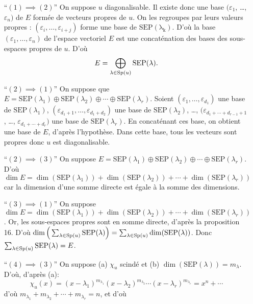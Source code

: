 \begin{prv}
	\begin{itemize}
		\item[``$(1)\implies(2)$''] On suppose $u$\/ diagonalisable. Il existe donc une base $(\varepsilon_1$, \ldots, $\varepsilon_n)$\/ de $E$\/ formée de vecteurs propres de $u$. On les regroupes par leurs valeurs propres : $(\varepsilon_i, \ldots, \varepsilon_{i+j})$\/ forme une base de $\mathrm{SEP(\lambda_k)}$. D'où la base $(\varepsilon_1, \ldots, \varepsilon_n)$\/ de l'espace vectoriel $E$\/ est une concaténation des bases des sous-espaces propres de $u$. D'où \[
				E = \bigoplus_{\lambda \in \operatorname{Sp}(u)} \mathrm{SEP}(\lambda)
			.\]
		\item[``$(2)\implies(1)$''] On suppose que $E = \mathrm{SEP}(\lambda_1) \oplus \mathrm{SEP}(\lambda_2) \oplus \cdots \oplus \mathrm{SEP}(\lambda_r)$.
			Soient $(\varepsilon_1, \ldots, \varepsilon_{d_1})$\/ une base de $\mathrm{SEP}(\lambda_1)$, $(\varepsilon_{d_1 + 1}, \ldots, \varepsilon_{d_1 + d_2})$\/ une base de $\mathrm{SEP}(\lambda_2)$, \ldots, $(\varepsilon_{d_1+\cdots + d_{r-1}+1}$, \ldots, $\varepsilon_{d_1+ \cdots + d_r})$\/ une base de $\mathrm{SEP}(\lambda_r)$.
			En concaténant ces base, on obtient une base de $E$, d'après l'hypothèse. Dans cette base, tous les vecteurs sont propres donc $u$\/ est diagonalisable.
		\item[``$(2)\implies(3)$''] On suppose $E = \mathrm{SEP}(\lambda_1) \oplus \mathrm{SEP}(\lambda_2) \oplus \cdots \oplus \mathrm{SEP}(\lambda_r)$. D'où  \[
					\dim E = \dim(\mathrm{SEP}(\lambda_1)) + \dim(\mathrm{SEP}(\lambda_2)) + \cdots + \dim(\mathrm{SEP}(\lambda_r))
			\] car la dimension d'une somme directe est égale à la somme des dimensions.
		\item[``$(3)\implies(1)$''] On suppose $\dim E = \dim(\mathrm{SEP}(\lambda_1)) + \dim(\mathrm{SEP}(\lambda_2)) + \cdots + \dim(\mathrm{SEP}(\lambda_r))$. Or, les sous-espaces propres sont en somme directe, d'après la proposition 16. D'où $\dim\Big(\sum_{\lambda \in \operatorname{Sp}(u)} \mathrm{SEP}(\lambda) \Big)= \sum_{\lambda \in \operatorname{Sp}(u)} \dim(\mathrm{SEP}(\lambda))$. Donc $\sum_{\lambda \in \operatorname{Sp}(u)} \mathrm{SEP}(\lambda) = E$.
		\item[``$(4)\implies(3)$''] On suppose (a) $\chi_u$\/ scindé et (b) $\dim(\mathrm{SEP}(\lambda)) = m_\lambda$. D'où, d'après (a): \[
				\chi_u(x) = (x - \lambda_1)^{m_{\lambda_1}}(x - \lambda_2)^{m_{\lambda_2}} \cdots (x - \lambda_r)^{m_{\lambda_r}} = x^n + \cdots
			\] d'où $m_{\lambda_1} + m_{\lambda_2} + \cdots + m_{\lambda_r} = n$, et d'où \[
\]
\end{itemize}
\end{prv}
